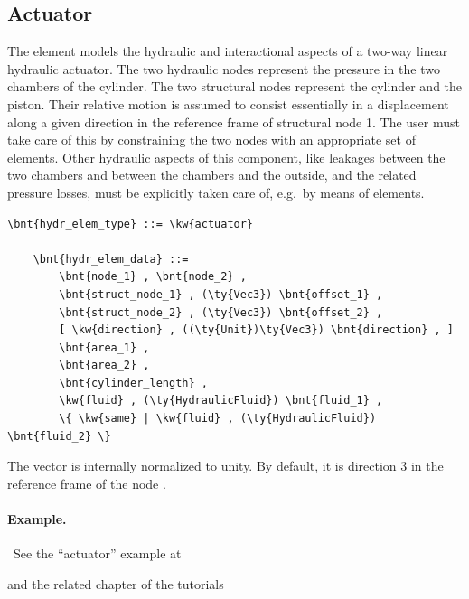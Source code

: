\subsection{Actuator}
The  element models the hydraulic and interactional aspects
of a two-way linear hydraulic actuator.
The two hydraulic nodes represent the pressure in the two chambers
of the cylinder.
The two structural nodes represent the cylinder and the piston.
Their relative motion is assumed to consist essentially
in a displacement along a given direction in the reference frame
of structural node 1.
The user must take care of this by constraining the two nodes
with an appropriate set of  elements.
Other hydraulic aspects of this component, like leakages between
the two chambers and between the chambers and the outside,
and the related pressure losses, must be explicitly taken care of,
e.g.\ by means of  elements.
\label{sec:EL:HYDR:ACTUATOR}
\begin{Verbatim}[commandchars=\\\{\}]
    \bnt{hydr_elem_type} ::= \kw{actuator}

    \bnt{hydr_elem_data} ::=
        \bnt{node_1} , \bnt{node_2} , 
        \bnt{struct_node_1} , (\ty{Vec3}) \bnt{offset_1} ,
        \bnt{struct_node_2} , (\ty{Vec3}) \bnt{offset_2} ,
        [ \kw{direction} , ((\ty{Unit})\ty{Vec3}) \bnt{direction} , ]
        \bnt{area_1} ,
        \bnt{area_2} ,
        \bnt{cylinder_length} ,
        \kw{fluid} , (\ty{HydraulicFluid}) \bnt{fluid_1} ,
        \{ \kw{same} | \kw{fluid} , (\ty{HydraulicFluid}) \bnt{fluid_2} \}
\end{Verbatim}
The vector  is internally normalized to unity.
By default, it is direction 3 in the reference frame of the 
node .

\paragraph{Example.} \
See the ``actuator'' example at
\begin{quote}
\end{quote}
and the related chapter of the tutorials
\begin{quote}
\end{quote}



